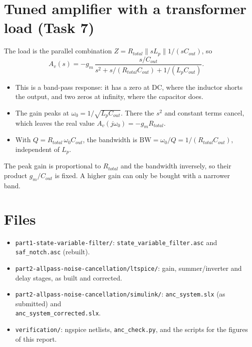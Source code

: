 \section{Tuned amplifier with a transformer load (Task 7)}
The load is the parallel combination $Z = R_{total}\parallel sL_p \parallel 1/(sC_{out})$, so
\[
A_v(s) = -g_m\,\frac{s/C_{out}}{s^2 + s/(R_{total}C_{out}) + 1/(L_pC_{out})}.
\]
\begin{itemize}
  \item This is a band-pass response: it has a zero at DC, where the inductor shorts the output, and two zeros at infinity, where the capacitor does.
  \item The gain peaks at $\omega_0 = 1/\sqrt{L_pC_{out}}$. There the $s^2$ and constant terms cancel, which leaves the real value $A_v(j\omega_0) = -g_mR_{total}$.
  \item With $Q = R_{total}\,\omega_0C_{out}$, the bandwidth is $\mathrm{BW} = \omega_0/Q = 1/(R_{total}C_{out})$, independent of $L_p$.
\end{itemize}
The peak gain is proportional to $R_{total}$ and the bandwidth inversely, so their product $g_m/C_{out}$ is fixed. A higher gain can only be bought with a narrower band.

\section*{Files}
\begin{itemize}
  \item \texttt{part1-state-variable-filter/}: \texttt{state\_variable\_filter.asc} and \texttt{saf\_notch.asc} (rebuilt).
  \item \texttt{part2-allpass-noise-cancellation/ltspice/}: gain, summer/inverter and delay stages, as built and corrected.
  \item \texttt{part2-allpass-noise-cancellation/simulink/}: \texttt{anc\_system.slx} (as submitted) and\\ \texttt{anc\_system\_corrected.slx}.
  \item \texttt{verification/}: ngspice netlists, \texttt{anc\_check.py}, and the scripts for the figures of this report.
\end{itemize}

